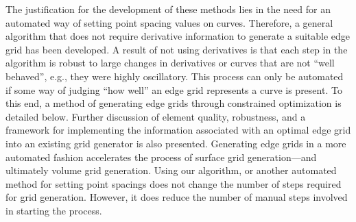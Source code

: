 The justification for the development of these methods lies in the need 
for an automated way of setting point spacing values on curves. Therefore, 
a general algorithm that does not require derivative information to generate a suitable edge grid has been 
developed. A result of not using derivatives is that each step in the algorithm is robust to large changes in 
derivatives or curves that are not ``well behaved'', e.g., they were highly oscillatory. This process can only be 
automated if some way of judging ``how well'' an edge grid represents a curve is present. To this end, a method of 
generating edge grids through constrained optimization is detailed below. Further discussion of element quality, 
robustness, and a framework for implementing the information associated with an optimal edge grid into an existing 
grid generator is also presented. Generating edge grids in a more automated fashion accelerates the process of 
surface grid generation---and ultimately volume grid generation. Using our algorithm, or another automated method 
for setting point spacings does not change the number of steps required for grid generation. However, it does 
reduce the number of manual steps involved in starting the process.


